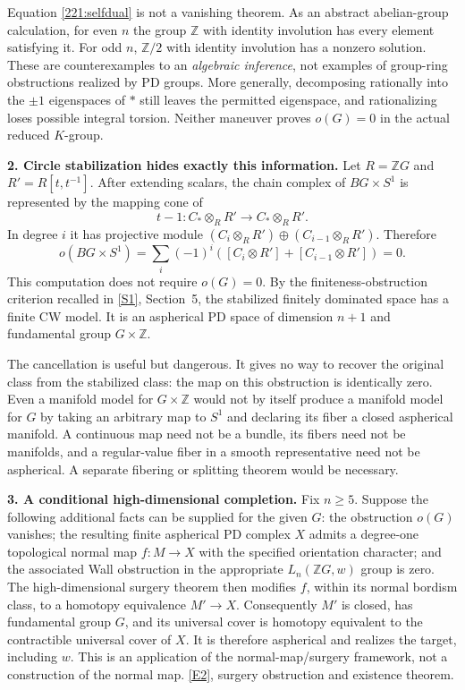 \documentclass[11pt,a4paper]{article}
\newcommand{\Z}{\mathbb{Z}}
\newcommand{\sref}[2]{\hyperlink{source:#1:#2}{[S#2]}}
\newcommand{\eref}[2]{\hyperlink{extra:#1:#2}{[E#2]}}
\numberwithin{equation}{section}
\begin{document}
Equation \eqref{221:selfdual} is not a vanishing theorem. As an abstract
abelian-group calculation, for even $n$ the group $\Z$ with identity
involution has every element satisfying it. For odd $n$, $\Z/2$ with
identity involution has a nonzero solution. These are counterexamples to
an \emph{algebraic inference}, not examples of group-ring obstructions
realized by PD groups. More generally, decomposing rationally into the
$\pm1$ eigenspaces of $*$ still leaves the permitted eigenspace, and
rationalizing loses possible integral torsion. Neither maneuver proves
$o(G)=0$ in the actual reduced $K$-group.

\textbf{2. Circle stabilization hides exactly this information.}
Let $R=\Z G$ and $R'=R[t,t^{-1}]$. After extending scalars, the chain
complex of $BG\times S^1$ is represented by the mapping cone of
\[
 t-1:C_*\otimes_RR'\longrightarrow C_*\otimes_RR'.
\]
In degree $i$ it has projective module
$(C_i\otimes_RR')\oplus(C_{i-1}\otimes_RR')$. Therefore
\begin{equation}\label{221:circle}
 o(BG\times S^1)=\sum_i(-1)^i([C_i\otimes R']+[C_{i-1}\otimes R'])=0.
\end{equation}
This computation does not require $o(G)=0$. By the finiteness-obstruction
criterion recalled in \sref{221}{1}, Section~5, the stabilized finitely
dominated space has a finite CW model. It is an aspherical PD space of
dimension $n+1$ and fundamental group $G\times\Z$.

The cancellation is useful but dangerous. It gives no way to recover the
original class from the stabilized class: the map on this obstruction is
identically zero. Even a manifold model for $G\times\Z$ would not by
itself produce a manifold model for $G$ by taking an arbitrary map to
$S^1$ and declaring its fiber a closed aspherical manifold. A continuous
map need not be a bundle, its fibers need not be manifolds, and a
regular-value fiber in a smooth representative need not be aspherical.
A separate fibering or splitting theorem would be necessary.

\textbf{3. A conditional high-dimensional completion.}
Fix $n\ge5$. Suppose the following additional facts can be supplied for
the given $G$: the obstruction $o(G)$ vanishes; the resulting finite
aspherical PD complex $X$ admits a degree-one topological normal map
$f:M\to X$ with the specified orientation character; and the associated
Wall obstruction in the appropriate $L_n(\Z G,w)$ group is zero.
The high-dimensional surgery theorem then modifies $f$, within its
normal bordism class, to a homotopy equivalence $M'\to X$.
Consequently $M'$ is closed, has fundamental group $G$, and its universal
cover is homotopy equivalent to the contractible universal cover of $X$.
It is therefore aspherical and realizes the target, including $w$.
This is an application of the normal-map/surgery framework, not a
construction of the normal map. \eref{221}{2}, surgery obstruction and
existence theorem.
\end{document}
